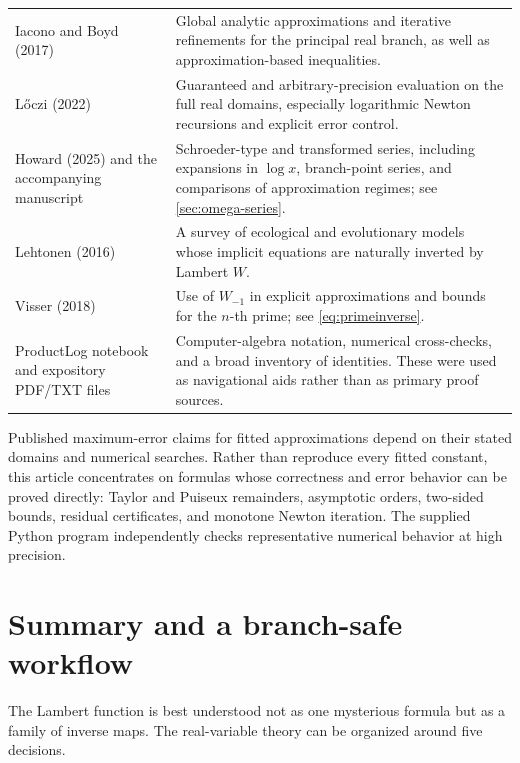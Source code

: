 \documentclass[11pt]{article}
\theoremstyle{remark}
\begin{document}
\begin{longtable}{@{}>{\raggedright\arraybackslash}p{}>{\raggedright\arraybackslash}p{}@{}}
\addlinespace
Iacono and Boyd (2017)~\cite{iacono2017} &
Global analytic approximations and iterative refinements for the principal
real branch, as well as approximation-based inequalities.\\
\addlinespace
L\H{o}czi (2022)~\cite{loczi2022} &
Guaranteed and arbitrary-precision evaluation on the full real domains,
especially logarithmic Newton recursions and explicit error control.\\
\addlinespace
Howard (2025) and the accompanying manuscript~\cite{howard2025} &
Schroeder-type and transformed series, including expansions in
\(\log x\), branch-point series, and comparisons of approximation regimes;
see \cref{sec:omega-series}.\\
\addlinespace
Lehtonen (2016)~\cite{lehtonen2016} &
A survey of ecological and evolutionary models whose implicit equations are
naturally inverted by Lambert \(W\).\\
\addlinespace
Visser (2018)~\cite{visser2018} &
Use of \(W_{-1}\) in explicit approximations and bounds for the \(n\)-th
prime; see \cref{eq:primeinverse}.\\
\addlinespace
ProductLog notebook and expository PDF/TXT files &
Computer-algebra notation, numerical cross-checks, and a broad inventory of
identities.  These were used as navigational aids rather than as primary
proof sources.\\
\bottomrule
\end{longtable}

Published maximum-error claims for fitted approximations depend on their
stated domains and numerical searches.  Rather than reproduce every fitted
constant, this article concentrates on formulas whose correctness and error
behavior can be proved directly: Taylor and Puiseux remainders, asymptotic
orders, two-sided bounds, residual certificates, and monotone Newton
iteration.  The supplied Python program independently checks representative
numerical behavior at high precision.

\section{Summary and a branch-safe workflow}\label{sec:summary}

The Lambert function is best understood not as one mysterious formula but as
a family of inverse maps.  The real-variable theory can be organized around
five decisions.
\end{document}
